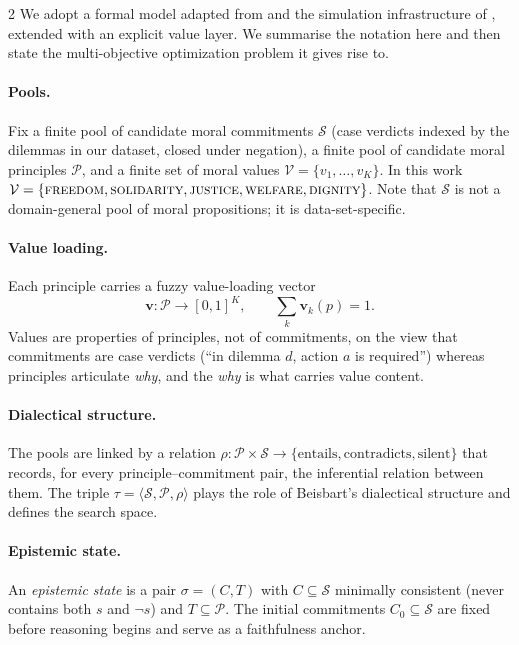 \documentclass[10pt]{article}
\begin{document}
\begin{multicols}{2}
We adopt a formal model adapted from \citet{beisbart2021} and the simulation
infrastructure of \citet{freivogel2023}, extended with an explicit value layer.
We summarise the notation here and then state the multi-objective optimization
problem it gives rise to.

\paragraph{Pools.} Fix a finite pool of candidate moral commitments
$\mathcal{S}$ (case verdicts indexed by the dilemmas in our dataset, closed
under negation), a finite pool of candidate moral principles
$\mathcal{P}$, and a finite set of moral values
$\mathcal{V} = \{v_1, \dots, v_K\}$. In this work
$\mathcal{V} = \{\textsc{freedom}, \textsc{solidarity}, \textsc{justice},
\textsc{welfare}, \textsc{dignity}\}$. Note that $\mathcal{S}$ is not a
domain-general pool of moral propositions; it is data-set-specific.

\paragraph{Value loading.} Each principle carries a fuzzy value-loading vector
\[
  \boldsymbol{v}: \mathcal{P} \to [0, 1]^K, \qquad
  \textstyle\sum_k \boldsymbol{v}_k(p) = 1.
\]
Values are properties of principles, not of commitments, on the view that
commitments are case verdicts (``in dilemma $d$, action $a$ is required'')
whereas principles articulate \emph{why}, and the \emph{why} is what carries
value content.

\paragraph{Dialectical structure.} The pools are linked by a relation
$\rho: \mathcal{P} \times \mathcal{S} \to \{\text{entails}, \text{contradicts},
\text{silent}\}$
that records, for every principle--commitment pair, the inferential relation
between them. The triple $\tau = \langle \mathcal{S}, \mathcal{P}, \rho \rangle$
plays the role of Beisbart's dialectical structure and defines the search space.

\paragraph{Epistemic state.} An \emph{epistemic state} is a pair
$\sigma = (C, T)$ with $C \subseteq \mathcal{S}$ minimally consistent (never
contains both $s$ and $\neg s$) and $T \subseteq \mathcal{P}$. The initial
commitments $C_0 \subseteq \mathcal{S}$ are fixed before reasoning begins and
serve as a faithfulness anchor.


\end{multicols}
\end{document}
